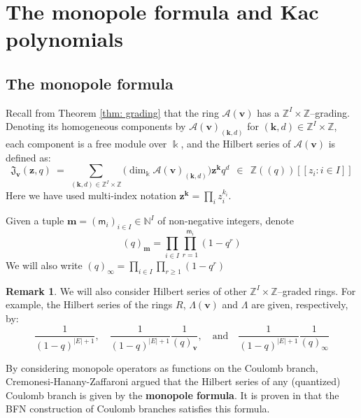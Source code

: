 \documentclass[11pt,reqno]{amsart}
\renewcommand{\mathbf}{\mathbold}
\numberwithin{equation}{section}
\theoremstyle{definition}
\newtheorem{Remark}[equation]{Remark}
\newcommand{\cA}{\mathcal{A}}
\newcommand{\fJ}{\mathfrak{J}}
\newcommand{\bk}{\mathbf{k}}
\newcommand{\bm}{\mathbf{m}}
\newcommand{\bv}{\mathbf{v}}
\newcommand{\bz}{\mathbf{z}}
\newcommand{\NN}{\mathbb{N}}
\newcommand{\ZZ}{\mathbb{Z}}
\newcommand{\kk}{\Bbbk}
\renewcommand{\bv}{\mathbf{v}} %
\newcommand{\sm}{\mathsf{m}}
\newcommand{\vertexset}{I}
\newcommand{\arrowset}{E}
\newcommand{\GT}{\Lambda}
\newcommand{\base}{R}
\newcommand{\qzast}{\cA}
\begin{document}
\section{The monopole formula and Kac polynomials}
\label{sec:monopolesandkac}


\subsection{The monopole formula}
Recall from Theorem \ref{thm: grading} that the ring $\qzast(\bv)$ has a $\ZZ^\vertexset \times \ZZ$--grading. Denoting its homogeneous components by $\qzast(\bv)_{(\bk, d)}$ for $(\bk, d) \in \ZZ^{\vertexset} \times \ZZ$, each component is a free module over $\kk$, and the Hilbert series of $\qzast(\bv)$ is defined as:
\begin{equation}
\fJ_\bv(\bz,q) \ = \ \sum_{(\bk, d) \in \ZZ^\vertexset \times \ZZ} \big( \dim_\kk \qzast(\bv)_{(\bk, d)} \big) \bz^\bk  q^d  \ \ \in \ \ \ZZ(\!(q)\!) [\![ z_i : i \in \vertexset ]\!]
\end{equation}
Here we have used multi-index notation $\bz^\bk = \prod_i z_i^{k_i}$. 

Given a tuple $\bm = (\sm_i)_{i \in \vertexset} \in \NN^\vertexset$ of non-negative integers,  denote
\begin{equation}
(q)_\bm = \prod_{i \in \vertexset} \prod_{r = 1}^{\sm_i} (1-q^r)
\end{equation}
We will also write $(q)_{\boldsymbol{\infty}} = \prod_{i \in \vertexset} \prod_{r \geq 1} (1-q^r)$
\begin{Remark}
    \label{eq: Hilb for base and GT}
    We will also consider Hilbert series of other  $\ZZ^\vertexset\times\ZZ$--graded rings. For example, the Hilbert series of the rings $\base$, $\GT(\bv)$  and $\GT$ are given, respectively, by:
\begin{equation*}
    \frac{1}{(1-q)^{|\arrowset|+1}}, \quad \frac{1}{(1-q)^{|\arrowset|+1}} \frac{1}{(q)_\bv},  \quad \text{and}\quad  \frac{1}{(1-q)^{|\arrowset|+1}} \frac{1}{(q)_{\boldsymbol{\infty}}}
\end{equation*}
\end{Remark}



By considering monopole operators as functions on the Coulomb branch, Cremonesi-Hanany-Zaffaroni \cite{CHZ2} argued that  the Hilbert series of any (quantized) Coulomb branch is given  by the \textbf{monopole formula}.  It is proven in \cite[\S 2(iii)]{BFN1} that the BFN construction of Coulomb branches satisfies this formula. 
\end{document}
